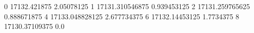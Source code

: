 0 17132.421875 2.05078125
1 17131.310546875 0.939453125
2 17131.259765625 0.888671875
4 17133.048828125 2.677734375
6 17132.14453125 1.7734375
8 17130.37109375 0.0
